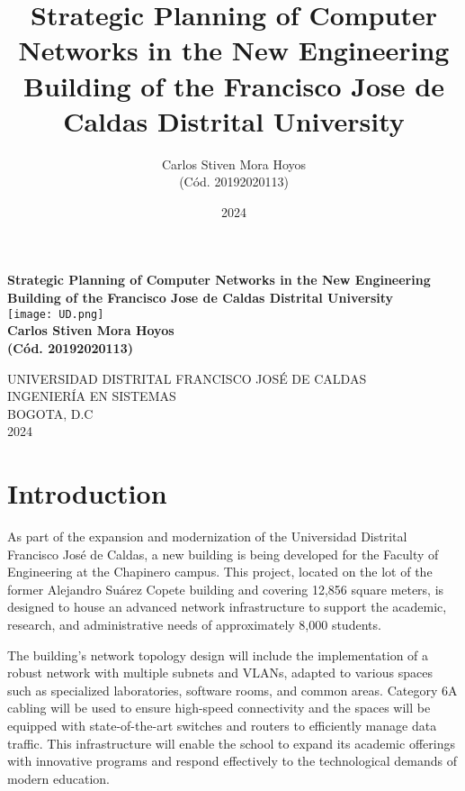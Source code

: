 \documentclass[12pt]{article}
\title{Strategic Planning of Computer Networks in the New Engineering Building of the Francisco Jose de Caldas Distrital University}
\author{Carlos Stiven Mora Hoyos \\ (Cód. 20192020113)}
\date{2024}
\begin{document}
\begin{titlepage}
    \centering
    \textbf{\LARGE Strategic Planning of Computer Networks in the New Engineering Building of the Francisco Jose de Caldas Distrital University} \\[1.5cm]
    \texttt{[image: UD.png]} \\[0.5cm]
    \textbf{\large Carlos Stiven Mora Hoyos \\ (Cód. 20192020113)} \\[1.5cm]
\begin{center}
    \vspace*{\fill}
    \vspace*{\fill}
    \vspace*{\fill}
    \vspace*{\fill}
    \vspace*{\fill}
    \large{UNIVERSIDAD DISTRITAL FRANCISCO JOSÉ DE CALDAS\\ INGENIERÍA EN SISTEMAS\\ BOGOTA, D.C\\ 2024}
\end{center}
    \vspace*{\fill}
\end{titlepage}


\newpage
\tableofcontents
\newpage

\section{Introduction}

As part of the expansion and modernization of the Universidad Distrital Francisco José de Caldas, a new building is being developed for the Faculty of Engineering at the Chapinero campus. This project, located on the lot of the former Alejandro Suárez Copete building and covering 12,856 square meters, is designed to house an advanced network infrastructure to support the academic, research, and administrative needs of approximately 8,000 students.

The building's network topology design will include the implementation of a robust network with multiple subnets and VLANs, adapted to various spaces such as specialized laboratories, software rooms, and common areas. Category 6A cabling will be used to ensure high-speed connectivity and the spaces will be equipped with state-of-the-art switches and routers to efficiently manage data traffic. This infrastructure will enable the school to expand its academic offerings with innovative programs and respond effectively to the technological demands of modern education.
\end{document}
